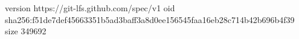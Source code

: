 version https://git-lfs.github.com/spec/v1
oid sha256:f51de7def45663351b5ad3baff3a8d0ee156545faa16eb28c714b42b696b4f39
size 349692
